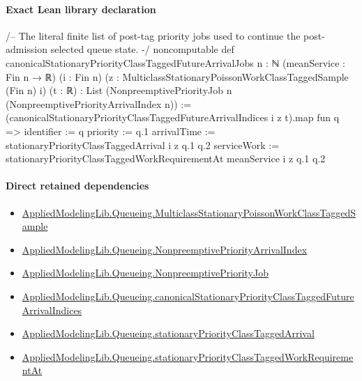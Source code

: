 \documentclass[10pt]{article}
\begin{document}
\paragraph{Exact Lean library declaration}
\begin{ReviewVerbatim}
/-- The literal finite list of post-tag priority jobs used to continue the
post-admission selected queue state. -/
noncomputable def canonicalStationaryPriorityClassTaggedFutureArrivalJobs
    {n : ℕ} (meanService : Fin n → ℝ) (i : Fin n)
    (z : MulticlassStationaryPoissonWorkClassTaggedSample (Fin n) i)
    (t : ℝ) : List (NonpreemptivePriorityJob n (NonpreemptivePriorityArrivalIndex n)) :=
  (canonicalStationaryPriorityClassTaggedFutureArrivalIndices i z t).map fun q =>
    { identifier := q
      priority := q.1
      arrivalTime := stationaryPriorityClassTaggedArrival i z q.1 q.2
      serviceWork := stationaryPriorityClassTaggedWorkRequirementAt meanService i z q.1 q.2 }
\end{ReviewVerbatim}

\paragraph{Direct retained dependencies}
\begin{itemize}\raggedright
\item \hyperlink{library-prerequisite-755cdb28ceaf46d2}{Applied\allowbreak{}Modeling\allowbreak{}Lib.\allowbreak{}Queueing.\allowbreak{}Multiclass\allowbreak{}Stationary\allowbreak{}Poisson\allowbreak{}Work\allowbreak{}Class\allowbreak{}Tagged\allowbreak{}Sample}
\item \hyperlink{governing-declaration-5d3724f4dc832d77}{Applied\allowbreak{}Modeling\allowbreak{}Lib.\allowbreak{}Queueing.\allowbreak{}Nonpreemptive\allowbreak{}Priority\allowbreak{}Arrival\allowbreak{}Index}
\item \hyperlink{library-prerequisite-2373fe691c32d999}{Applied\allowbreak{}Modeling\allowbreak{}Lib.\allowbreak{}Queueing.\allowbreak{}Nonpreemptive\allowbreak{}Priority\allowbreak{}Job}
\item \hyperlink{governing-declaration-e1de2ae4651d3437}{Applied\allowbreak{}Modeling\allowbreak{}Lib.\allowbreak{}Queueing.\allowbreak{}canonical\allowbreak{}Stationary\allowbreak{}Priority\allowbreak{}Class\allowbreak{}Tagged\allowbreak{}Future\allowbreak{}Arrival\allowbreak{}Indices}
\item \hyperlink{governing-declaration-2945df1a7a8ec970}{Applied\allowbreak{}Modeling\allowbreak{}Lib.\allowbreak{}Queueing.\allowbreak{}stationary\allowbreak{}Priority\allowbreak{}Class\allowbreak{}Tagged\allowbreak{}Arrival}
\item \hyperlink{governing-declaration-949c09de5ada557f}{Applied\allowbreak{}Modeling\allowbreak{}Lib.\allowbreak{}Queueing.\allowbreak{}stationary\allowbreak{}Priority\allowbreak{}Class\allowbreak{}Tagged\allowbreak{}Work\allowbreak{}Requirement\allowbreak{}At}
\end{itemize}
\end{document}
